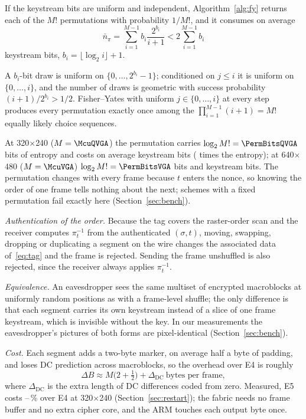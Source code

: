 \begin{proposition}\label{prop:perm}
If the keystream bits are uniform and independent, Algorithm~\ref{alg:fy} returns each of the $M!$ permutations with probability $1/M!$, and it consumes on average
\begin{equation}
\bar n_\pi = \sum_{i=1}^{M-1} b_i \frac{2^{b_i}}{i+1} < 2 \sum_{i=1}^{M-1} b_i
\label{eq:fybits}
\end{equation}
keystream bits, $b_i = \lfloor \log_2 i \rfloor + 1$.
\end{proposition}
\begin{IEEEproof}
A $b_i$-bit draw is uniform on $\{0, \ldots, 2^{b_i} - 1\}$; conditioned on $j \le i$ it is uniform on $\{0, \ldots, i\}$, and the number of draws is geometric with success probability $(i+1)/2^{b_i} > 1/2$. Fisher--Yates with uniform $j \in \{0, \ldots, i\}$ at every step produces every permutation exactly once among the $\prod_{i=1}^{M-1}(i+1) = M!$ equally likely choice sequences.
\end{IEEEproof}
At 320$\times$240 ($M = \McuQVGA$) the permutation carries $\log_2 M! = \PermBitsQVGA$ bits of entropy and costs on average \FyBitsQVGA{} keystream bits (\FyRatioQVGA{} times the entropy); at 640$\times$480 ($M = \McuVGA$) $\log_2 M! = \PermBitsVGA$ bits and \FyBitsVGA{} keystream bits. The permutation changes with every frame because $t$ enters the nonce, so knowing the order of one frame tells nothing about the next; schemes with a fixed permutation fail exactly here (Section~\ref{sec:bench}).

\textit{Authentication of the order.} Because the tag covers the raster-order scan and the receiver computes $\pi_t^{-1}$ from the authenticated $(\sigma, t)$, moving, swapping, dropping or duplicating a segment on the wire changes the associated data of~\eqref{eq:tag} and the frame is rejected. Sending the frame unshuffled is also rejected, since the receiver always applies $\pi_t^{-1}$.

\textit{Equivalence.} An eavesdropper sees the same multiset of encrypted macroblocks at uniformly random positions as with a frame-level shuffle; the only difference is that each segment carries its own keystream instead of a slice of one frame keystream, which is invisible without the key. In our measurements the eavesdropper's pictures of both forms are pixel-identical (Section~\ref{sec:bench}).

\textit{Cost.} Each segment adds a two-byte marker, on average half a byte of padding, and loses DC prediction across macroblocks, so the overhead over E4 is roughly
\begin{equation}
\Delta B \approx M\bigl(2 + \tfrac12\bigr) + \Delta_{\mathrm{DC}} \ \text{bytes per frame},
\label{eq:e5cost}
\end{equation}
where $\Delta_{\mathrm{DC}}$ is the extra length of DC differences coded from zero. Measured, E5 costs \RiOverheadOneMin--\RiOverheadOneMax\,\% over E4 at 320$\times$240 (Section~\ref{sec:restart}); the fabric needs no frame buffer and no extra cipher core, and the ARM touches each output byte once.

